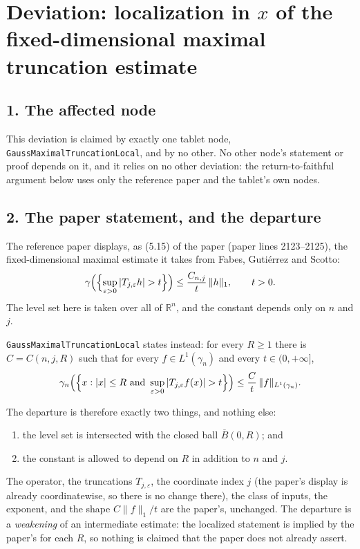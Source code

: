 \section*{Deviation: localization in $x$ of the fixed-dimensional maximal
truncation estimate}

\subsection*{1. The affected node}

This deviation is claimed by exactly one tablet node,
\texttt{GaussMaximalTruncationLocal}, and by no other.  No other node's
statement or proof depends on it, and it relies on no other deviation: the
return-to-faithful argument below uses only the reference paper and the
tablet's own nodes.

\subsection*{2. The paper statement, and the departure}

The reference paper displays, as (5.15) of the paper (paper lines
2123--2125), the fixed-dimensional maximal estimate it takes from
Fabes, Guti\'errez and Scotto:
\[
  \gamma\Bigl(\Bigl\{\sup_{\varepsilon>0}|T_{j,\varepsilon}h|>t\Bigr\}\Bigr)
    \leq \frac{C_{n,j}}{t}\,\|h\|_1 , \qquad t>0 .
\]
The level set here is taken over all of $\mathbb{R}^n$, and the constant
depends only on $n$ and $j$.

\texttt{GaussMaximalTruncationLocal} states instead: for every $R \geq 1$ there
is $C = C(n,j,R)$ such that for every $f \in L^1(\gamma_n)$ and every
$t \in (0,+\infty]$,
\[
  \gamma_n\Bigl(\Bigl\{x : |x| \leq R \text{ and }
      \sup_{\varepsilon>0}|T_{j,\varepsilon}f(x)| > t\Bigr\}\Bigr)
    \leq \frac{C}{t}\,\|f\|_{L^1(\gamma_n)} .
\]

The departure is therefore exactly two things, and nothing else:
\begin{enumerate}
\item the level set is intersected with the closed ball $\overline B(0,R)$; and
\item the constant is allowed to depend on $R$ in addition to $n$ and $j$.
\end{enumerate}
The operator, the truncations $T_{j,\varepsilon}$, the coordinate index $j$
(the paper's display is already coordinatewise, so there is no change there),
the class of inputs, the exponent, and the shape $C\|f\|_1/t$ are the paper's,
unchanged.  The departure is a \emph{weakening} of an intermediate estimate: the
localized statement is implied by the paper's for each $R$, so nothing is
claimed that the paper does not already assert.

